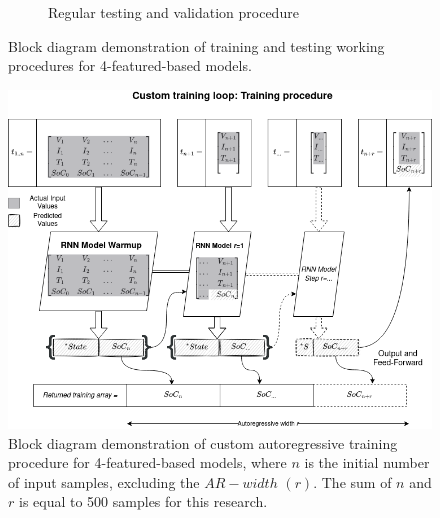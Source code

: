 {\begin{figure}[htbp]
\begin{subfigure}[b]{0.85\textwidth}
            \caption{Regular testing and validation procedure}
            \label{subfig:testing}
        \end{subfigure}
        \caption{Block diagram demonstration of training and testing working procedures for 4-featured-based models.}
        \label{fig:training_testing}
    \end{figure}
} {
    \begin{figure}[!t]
        \centering
        \includegraphics[width=0.85\linewidth]{II_Body/images/Autoregression_updated-Training.png}
        \caption{Block diagram demonstration of custom autoregressive training procedure for 4-featured-based models, where $n$ is the initial number of input samples, excluding the $AR-width$ $(r)$. The sum of $n$ and $r$ is equal to 500 samples for this research.}
        \label{fig:training_testing}
    \end{figure}
}

